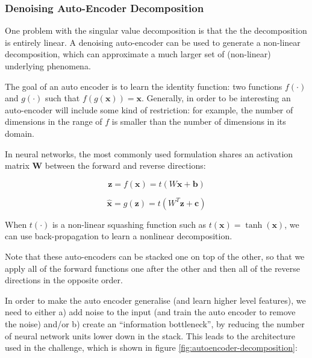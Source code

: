 \documentclass{article}
\begin{document}
\subsubsection{Denoising Auto-Encoder Decomposition}

One problem with the singular value decomposition is that the the decomposition is entirely linear.  A denoising auto-encoder \cite{Vincent-TR1316} can be used to generate a non-linear decomposition, which can approximate a much larger set of (non-linear) underlying phenomena.

The goal of an auto encoder is to learn the identity function: two functions $f(\cdot)$ and $g(\cdot)$ such that $f(g(\mathbf{x})) = \mathbf{x}$.  Generally, in order to be interesting an auto-encoder will include some kind of restriction: for example, the number of dimensions in the range of $f$ is smaller than the number of dimensions in its domain.

In neural networks, the most commonly used formulation shares an activation matrix $\mathbf{W}$ between the forward and reverse directions:

\begin{equation}
\label{eqn:autoencoder-encode}
\mathbf{z} = f(\mathbf{x}) = t(W\mathbf{x} + \mathbf{b})
\end{equation}

\begin{equation}
\label{eqn:autoencoder-decode}
\hat{\mathbf{x}} = g(\mathbf{z}) = t(W^T\mathbf{z} + \mathbf{c})
\end{equation}

When $t(\cdot)$ is a non-linear squashing function such as $t(\mathbf{x}) = \tanh(\mathbf{x})$, we can use back-propagation to learn a nonlinear decomposition.

Note that these auto-encoders can be stacked one on top of the other, so that we apply all of the forward functions one after the other and then all of the reverse directions in the opposite order.

In order to make the auto encoder generalise (and learn higher level features), we need to either a) add noise to the input (and train the auto encoder to remove the noise) and/or b) create an ``information bottleneck'', by reducing the number of neural network units lower down in the stack.  This leads to the architecture used in the challenge, which is shown in figure \ref{fig:autoencoder-decomposition}:
\end{document}
